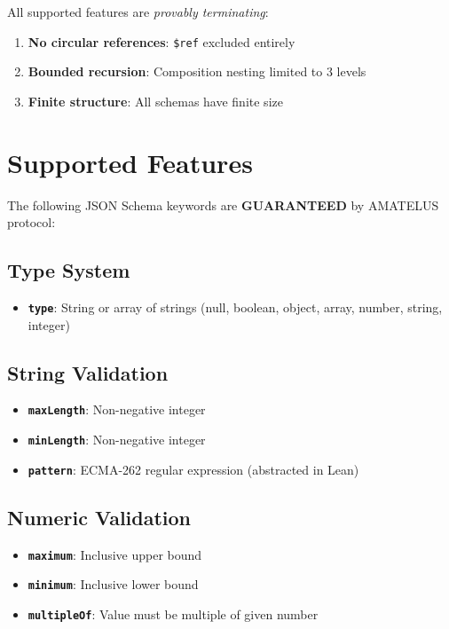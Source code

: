 All supported features are \emph{provably terminating}:

\begin{enumerate}
  \item \textbf{No circular references}: \texttt{\$ref} excluded entirely
  \item \textbf{Bounded recursion}: Composition nesting limited to 3 levels
  \item \textbf{Finite structure}: All schemas have finite size
\end{enumerate}

\section{Supported Features}

The following JSON Schema keywords are \textbf{GUARANTEED} by AMATELUS protocol:

\subsection{Type System}

\begin{itemize}
  \item \textbf{\texttt{type}}: String or array of strings (null, boolean, object, array, number, string, integer)
\end{itemize}

\subsection{String Validation}

\begin{itemize}
  \item \textbf{\texttt{maxLength}}: Non-negative integer
  \item \textbf{\texttt{minLength}}: Non-negative integer
  \item \textbf{\texttt{pattern}}: ECMA-262 regular expression (abstracted in Lean)
\end{itemize}

\subsection{Numeric Validation}

\begin{itemize}
  \item \textbf{\texttt{maximum}}: Inclusive upper bound
  \item \textbf{\texttt{minimum}}: Inclusive lower bound
  \item \textbf{\texttt{multipleOf}}: Value must be multiple of given number
\end{itemize}

